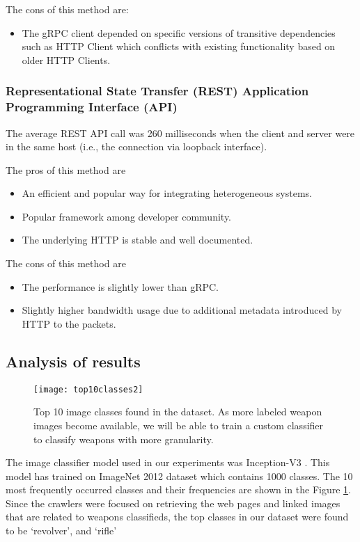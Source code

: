 The cons of this method are:
\begin{itemize}
	\item The gRPC client depended on specific versions of transitive dependencies such as HTTP Client which conflicts with existing functionality based on older HTTP Clients.
\end{itemize}

\subsubsection{Representational State Transfer (REST) Application Programming Interface (API)} \label{sec:eval-rest}

The average REST API call was 260 milliseconds when the client and server were in the same host (i.e., the connection via loopback interface).

The pros of this method are
\begin{itemize}
	\item An efficient and popular way for integrating heterogeneous systems.
	\item Popular framework among developer community.
	\item The underlying HTTP is stable and well documented.
\end{itemize}

The cons of this method are
\begin{itemize}
	\item The performance is slightly lower than gRPC.
	\item Slightly higher bandwidth usage due to additional metadata introduced by HTTP to the packets.
\end{itemize}
\fi  %

\subsection{Analysis of results}
\begin{figure}[h]
	\texttt{[image: top10classes2]}
	\caption{Top 10 image classes found in the dataset. As more labeled weapon images become available, we will be able to train a custom classifier to classify weapons with more granularity.}
	\label{fig:top10ImgClass}
\end{figure}
The image classifier model used in our experiments was Inception-V3 \cite{SzegedyVISW15}. This model has trained on ImageNet 2012 dataset which contains 1000 classes\cite{ILSVRC15}.
The 10 most frequently occurred classes and their frequencies are shown in the Figure \ref{fig:top10ImgClass}. Since the crawlers were focused on retrieving the web pages and linked images that are related to weapons classifieds, the top classes in our dataset were found to be `revolver', and `rifle'

